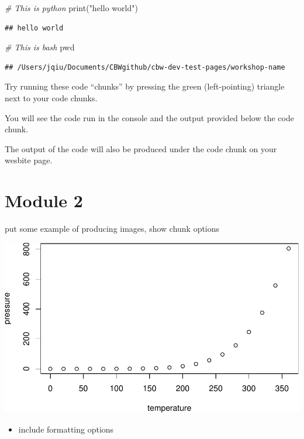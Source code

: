 \documentclass[
]{book}
\newenvironment{Shaded}{\begin{snugshade}}{\end{snugshade}}
\newcommand{\BuiltInTok}[1]{#1}
\newcommand{\CommentTok}[1]{\textcolor[rgb]{0.56,0.35,0.01}{\textit{#1}}}
\newcommand{\NormalTok}[1]{#1}
\newcommand{\StringTok}[1]{\textcolor[rgb]{0.31,0.60,0.02}{#1}}
\providecommand{\tightlist}{%
  \setlength{\itemsep}{0pt}\setlength{\parskip}{0pt}}
\begin{document}
\begin{Shaded}
\begin{Highlighting}[]
\CommentTok{\# This is python}
\BuiltInTok{print}\NormalTok{(}\StringTok{"hello world"}\NormalTok{)}
\end{Highlighting}
\end{Shaded}

\begin{verbatim}
## hello world
\end{verbatim}

\begin{Shaded}
\begin{Highlighting}[]
\CommentTok{\# This is bash}
\BuiltInTok{pwd}
\end{Highlighting}
\end{Shaded}

\begin{verbatim}
## /Users/jqiu/Documents/CBWgithub/cbw-dev-test-pages/workshop-name
\end{verbatim}

Try running these code ``chunks'' by pressing the green (left-pointing) triangle next to your code chunks.

You will see the code run in the console and the output provided below the code chunk.

The output of the code will also be produced under the code chunk on your wesbite page.

\chapter{Module 2}\label{module-2}

put some example of producing images, show chunk options

\includegraphics{_main_files/figure-latex/pressure-plot-1.pdf}

\begin{itemize}
\tightlist
\item
  include formatting options
\end{itemize}

  
\end{document}
